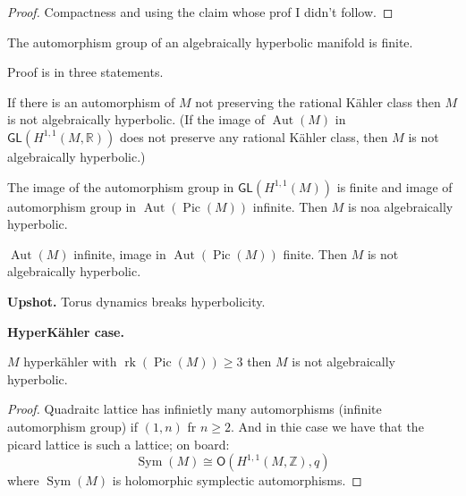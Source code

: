 \begin{proof}
Compactness and using the claim whose prof I
didn't follow.
\end{proof}

\begin{theorem}
\label{theorem-ah-bogomolov-kamenova}
The automorphism group of an algebraically
hyperbolic manifold is finite.
\end{theorem}

Proof is in three statements.

\begin{proposition}
\label{proposition-ah-rational-kahler}
If there is an automorphism of $M$ not
preserving the rational Kähler class then $M$
is not algebraically hyperbolic. (If the
image of $\operatorname{Aut}(M)$ in
$\mathsf{GL}(H^{1,1}(M,\mathbb{R}))$ does not
preserve any rational Kähler class, then $M$
is not algebraically hyperbolic.)
\end{proposition}

\begin{proposition}
\label{proposition-ah-trickiest}
The image of the automorphism group in
$\mathsf{GL}(H^{1,1}(M))$ is finite and image
of automorphism group in
$\operatorname{Aut}(\operatorname{Pic}(M))$
infinite. Then $M$ is noa algebraically
hyperbolic.
\end{proposition}

\begin{proposition}[Proposition 3]
\label{proposition-ah-third}
$\operatorname{Aut}(M)$ infinite, image in
$\operatorname{Aut}(\operatorname{Pic}(M))$
finite. Then $M$ is not algebraically
hyperbolic.
\end{proposition}

\medskip\noindent
{\bf Upshot.}
Torus dynamics breaks hyperbolicity.

\medskip\noindent
{\bf HyperKähler case.}

\begin{theorem}[Them?]
\label{theorem-ah-hyperkahler}
$M$ hyperkähler with
$\operatorname{rk}(\operatorname{Pic}(M))\geq
3$ then $M$ is not algebraically hyperbolic.
\end{theorem}

\begin{proof}
Quadraitc lattice has infinietly many
automorphisms (infinite automorphism group)
if $(1,n)$ fr $n\geq 2$. And in thie case we
have that the picard lattice is such a
lattice; on board:
$$
\operatorname{Sym}(M)\cong
\mathsf{O}(H^{1,1}(M,\mathbb{Z}),q)
$$
where $\operatorname{Sym}(M)$ is holomorphic
symplectic automorphisms.
\end{proof}

